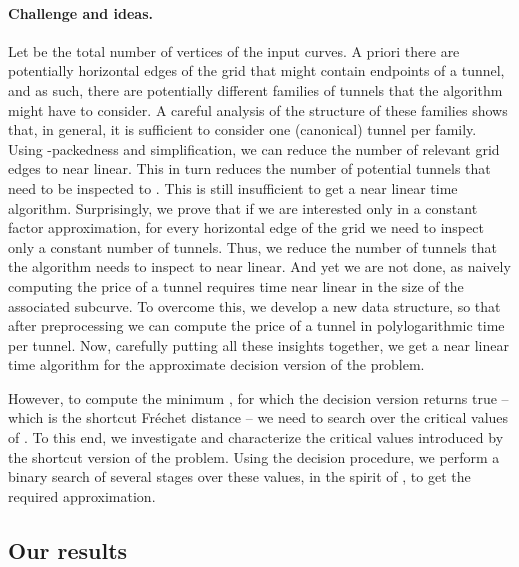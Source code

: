 \documentclass[12pt]{article}
\newcommand{\Frechet}{Fr\'{e}c{h}e{}t\xspace}\providecommand{\Arr}{\mathop{\mathrm{\EuScript{A}}}}
\newcommand{\tunnel}{tunnel\xspace}
\newcommand{\tunnels}{tunnels\xspace}
\numberwithin{figure}{section}
\numberwithin{equation}{section}
\begin{document}
\paragraph{Challenge and ideas.}
Let  be the total number of vertices of the input curves. A priori
there are potentially  horizontal edges of the grid that might
contain endpoints of a \tunnel, and as such, there are potentially
 different families of \tunnels that the algorithm might have
to consider.  A careful analysis of the structure of these families
shows that, in general, it is sufficient to consider one (canonical)
\tunnel per family.  Using -packedness and simplification, we can
reduce the number of relevant grid edges to near linear.  This in turn
reduces the number of potential \tunnels that need to be inspected to
.  This is still insufficient to get a near linear time
algorithm. Surprisingly, we prove that if we are interested only in a
constant factor approximation, for every horizontal edge of the grid
we need to inspect only a constant number of \tunnels.  Thus, we
reduce the number of \tunnels that the algorithm needs to inspect to
near linear. And yet we are not done, as naively computing the price
of a \tunnel requires time near linear in the size of the associated
subcurve.  To overcome this, we develop a new data structure, so that
after preprocessing we can compute the price of a \tunnel in
polylogarithmic time per \tunnel. Now, carefully putting all these
insights together, we get a near linear time algorithm for the
approximate decision version of the problem.

However, to compute the minimum , for which the decision
version returns true -- which is the shortcut \Frechet distance -- we
need to search over the critical values of . To this end, we
investigate and characterize the critical values introduced by the
shortcut version of the problem.  Using the decision procedure, we
perform a binary search of several stages over these values, in the
spirit of \cite{dhw-afdrc-12}, to get the required approximation.


\subsection*{Our results}
\end{document}
